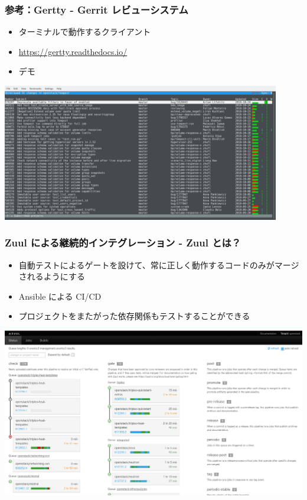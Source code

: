 \documentclass[aspectratio=169,11pt,hyperref={colorlinks=true}]{beamer}
\begin{document}
\begin{frame}
  \frametitle{参考：Gertty - Gerrit レビューシステム }
  \begin{itemize}
    \item ターミナルで動作するクライアント
    \item \url{https://gertty.readthedocs.io/}
    \item デモ
  \end{itemize}
  \centering
  \includegraphics[height=60mm]{images/gertty.png}
\end{frame}

\begin{frame}
  \frametitle{Zuul による継続的インテグレーション - Zuul とは？}
  \begin{itemize}
    \item 自動テストによるゲートを設けて、常に正しく動作するコードのみがマージされるようにする
    \item Ansible による CI/CD
    \item プロジェクトをまたがった依存関係もテストすることができる
  \end{itemize}
  \centering\includegraphics[scale=0.2]{images/zuul-status.png}
\end{frame}
\end{document}
